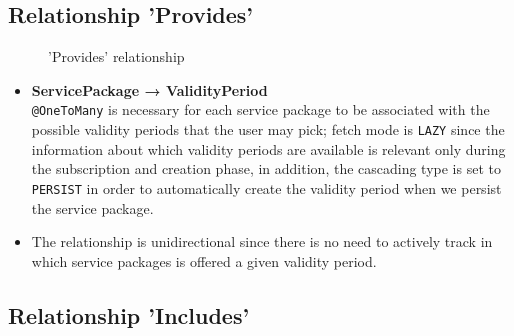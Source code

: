 \subsection*{Relationship 'Provides'}

\begin{minipage}[h]{0.5\textwidth}
    \begin{figure}[H]
        
        \caption{'Provides' relationship}
        \label{fig:orm_sp_vp}
    \end{figure}
\end{minipage}
\hfill
\begin{minipage}[h]{0.48\textwidth}
    \begin{itemize}
        \item \textbf{ServicePackage → ValidityPeriod} \\ \texttt{@OneToMany} is necessary for each service package to be associated with the possible validity periods that the user may pick; fetch mode is \texttt{LAZY} since the information about which validity periods are available is relevant only during the subscription and creation phase, in addition, the cascading type is set to \texttt{PERSIST} in order to automatically create the validity period when we persist the service package.
        \item The relationship is unidirectional since there is no need to actively track in which service packages is offered a given validity period.
    \end{itemize}
\end{minipage}

\subsection*{Relationship 'Includes'}

